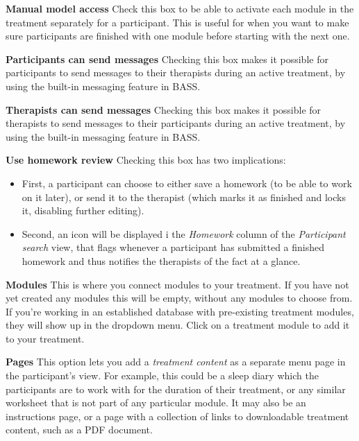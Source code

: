 \documentclass[]{book}
\providecommand{\tightlist}{%
  \setlength{\itemsep}{0pt}\setlength{\parskip}{0pt}}
\begin{document}
\textbf{Manual model access}
Check this box to be able to activate each module in the treatment separately for a participant. This is useful for when you want to make sure participants are finished with one module before starting with the next one.

\textbf{Participants can send messages}
Checking this box makes it possible for participants to send messages to their therapists during an active treatment, by using the built-in messaging feature in BASS.

\textbf{Therapists can send messages}
Checking this box makes it possible for therapists to send messages to their participants during an active treatment, by using the built-in messaging feature in BASS.

\textbf{Use homework review}
Checking this box has two implications:

\begin{itemize}
\tightlist
\item
  First, a participant can choose to either save a homework (to be able to work on it later), or send it to the therapist (which marks it as finished and locks it, disabling further editing).
\item
  Second, an icon will be displayed i the \emph{Homework} column of the \emph{Participant search} view, that flags whenever a participant has submitted a finished homework and thus notifies the therapists of the fact at a glance.
\end{itemize}

\textbf{Modules}
This is where you connect modules to your treatment. If you have not yet created any modules this will be empty, without any modules to choose from.
If you're working in an established database with pre-existing treatment modules, they will show up in the dropdown menu. Click on a treatment module to add it to your treatment.

\textbf{Pages}
This option lets you add a \emph{treatment content} as a separate menu page in the participant's view. For example, this could be a sleep diary which the participants are to work with for the duration of their treatment, or any similar worksheet that is not part of any particular module. It may also be an instructions page, or a page with a collection of links to downloadable treatment content, such as a PDF document.
\end{document}
